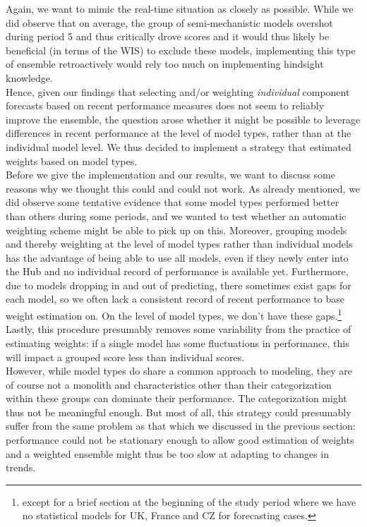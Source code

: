 Again, we want to mimic the real-time situation as closely as possible. While we did observe that on average, the group of semi-mechanistic models overshot during period 5 and thus critically drove scores and it would thus likely be beneficial (in terms of the WIS) to exclude these models, implementing this type of ensemble retroactively would rely too much on implementing hindsight knowledge.\\
Hence, given our findings that selecting and/or weighting \textit{individual} component forecasts based on recent performance measures does not seem to reliably improve the ensemble, the question arose whether it might be possible to leverage differences in recent performance at the level of model types, rather than at the individual model level. We thus decided to implement a strategy that estimated weights based on model types.\\
Before we give the implementation and our results, we want to discuss some reasons why we thought this could and could not work. As already mentioned, we did observe some tentative evidence that some model types performed better than others during some periods, and we wanted to test whether an automatic weighting scheme might be able to pick up on this. Moreover, grouping models and thereby weighting at the level of model types rather than individual models has the advantage of being able to use all models, even if they newly enter into the Hub and no individual record of performance is available yet. Furthermore, due to models dropping in and out of predicting, there sometimes exist gaps for each model, so we often lack a consistent record of recent performance to base weight estimation on. On the level of model types, we don't have these gaps.\footnote{except for a brief section at the beginning of the study period where we have no statistical models for UK, France and CZ for forecasting cases.} Lastly, this procedure presumably removes some variability from the practice of estimating weights: if a single model has some fluctuations in performance, this will impact a grouped score less than individual scores.\\
However, while model types do share a common approach to modeling, they are of course not a monolith and characteristics other than their categorization within these groups can dominate their performance. The categorization might thus not be meaningful enough. But most of all, this strategy could presumably suffer from the same problem as that which we discussed in the previous section: performance could not be stationary enough to allow good estimation of weights and a weighted ensemble might thus be too slow at adapting to changes in trends. \\

